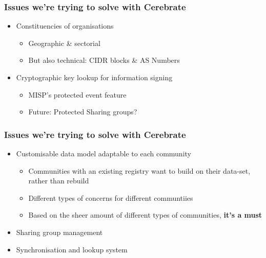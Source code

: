 \begin{frame}
\frametitle{Issues we're trying to solve with Cerebrate}
    \begin{itemize}
        \item Constituencies of organisations
        \begin{itemize}
            \item Geographic \& sectorial
            \item But also technical: CIDR blocks \& AS Numbers
        \end{itemize}
        \vspace{0.5em}
        \item Cryptographic key lookup for information signing
        \begin{itemize}
            \item MISP's protected event feature
            \item Future: Protected Sharing groups? 
        \end{itemize}
    \end{itemize}
\end{frame}

\begin{frame}
\frametitle{Issues we're trying to solve with Cerebrate}
    \begin{itemize}
        \item Customisable data model adaptable to each community
        \begin{itemize}
            \item Communities with an existing registry want to build on their data-set, rather than rebuild
            \item Different types of concerns for different communtiies
            \item Based on the sheer amount of different types of communities, \textbf{it's a must}
        \end{itemize}
        \item Sharing group management
        \item Synchronisation and lookup system
    \end{itemize}
\end{frame}

